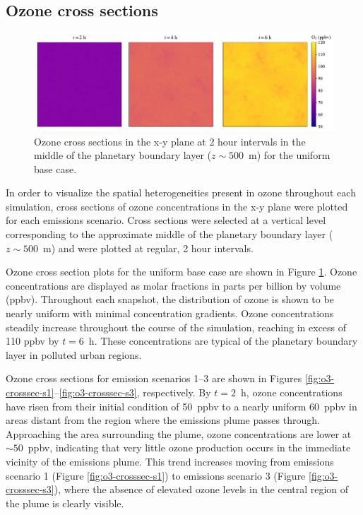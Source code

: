 
\subsection{Ozone cross sections}

\begin{figure}[h]
    \centering
    \includegraphics[width=\textwidth]{figures/chapter4/o3-crosssec-uniform-basecase-z25.pdf}
    \caption{Ozone cross sections in the x-y plane at 2 hour intervals in the middle of the planetary boundary layer ($z\sim500$~\si{m}) for the uniform base case.}
    \label{fig:o3-crosssec-ub}
  \end{figure}

In order to visualize the spatial heterogeneities present in ozone throughout each simulation, cross sections of ozone concentrations in the x-y plane were plotted for each emissions scenario. Cross sections were selected at a vertical level corresponding to the approximate middle of the planetary boundary layer ($z\sim500$~\si{m}) and were plotted at regular, 2 hour intervals. 

Ozone cross section plots for the uniform base case are shown in Figure \ref{fig:o3-crosssec-ub}. Ozone concentrations are displayed as molar fractions in parts per billion by volume (ppbv). Throughout each snapshot, the distribution of ozone is shown to be nearly uniform with minimal concentration gradients. Ozone concentrations steadily increase throughout the course of the simulation, reaching in excess of 110 ppbv by $t=6$~h. These concentrations are typical of the planetary boundary layer in polluted urban regions.

Ozone cross sections for emission scenarios 1--3 are shown in Figures \ref{fig:o3-crosssec-s1}--\ref{fig:o3-crosssec-s3}, respectively. By $t=2$~h, ozone concentrations have risen from their initial condition of 50~\si{ppbv} to a nearly uniform 60~\si{ppbv} in areas distant from the region where the emissions plume passes through. Approaching the area surrounding the plume, ozone concentrations are lower at  $\sim50$~\si{ppbv}, indicating that very little ozone production occurs in the immediate vicinity of the emissions plume. This trend increases moving from emissions scenario 1 (Figure \ref{fig:o3-crosssec-s1}) to emissions scenario 3 (Figure \ref{fig:o3-crosssec-s3}), where the absence of elevated ozone levels in the central region of the plume is clearly visible. 

